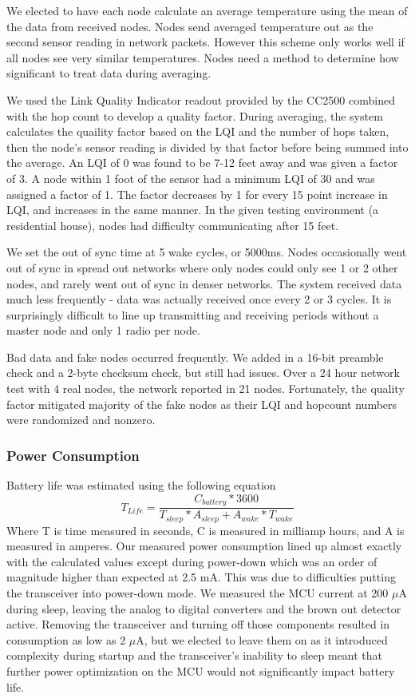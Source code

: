 We elected to have each node calculate an average temperature using the mean of the data from received nodes. Nodes send averaged temperature out as the second sensor reading in network packets. However this scheme only works well if all nodes see very similar temperatures. Nodes need a method to determine how significant to treat data during averaging.

We used the Link Quality Indicator readout provided by the CC2500 combined with the hop count to develop a quality factor. During averaging, the system calculates the quaility factor based on the LQI and the number of hops taken, then the node's sensor reading is divided by that factor before being summed into the average. An LQI of 0 was found to be 7-12 feet away and was given a factor of 3. A node within 1 foot of the sensor had a minimum LQI of 30 and was assigned a factor of 1. The factor decreases by 1 for every 15 point increase in LQI, and increases in the same manner. In the given testing environment (a residential house), nodes had difficulty communicating after 15 feet.

We set the out of sync time at 5 wake cycles, or 5000ms. Nodes occasionally went out of sync in spread out networks where only nodes could only see 1 or 2 other nodes, and rarely went out of sync in denser networks. The system received data much less frequently - data was actually received once every 2 or 3 cycles. It is surprisingly difficult to line up transmitting and receiving periods without a master node and only 1 radio per node.

Bad data and fake nodes occurred frequently. We added in a 16-bit preamble check and a 2-byte checksum check, but still had issues. Over a 24 hour network test with 4 real nodes, the network reported in 21 nodes. Fortunately, the quality factor mitigated majority of the fake nodes as their LQI and hopcount numbers were randomized and nonzero.

\subsubsection{Power Consumption}
Battery life was estimated using the following equation
\[T_{Life}=\frac{C_{battery} * 3600}{T_{sleep}*A_{sleep} + A_{wake}*T_{wake}}\] Where T is time measured in seconds, C is measured in milliamp hours, and A is measured in amperes.
Our measured power consumption lined up almost exactly with the calculated values except during power-down which was an order of magnitude higher than expected at 2.5 mA. This was due to difficulties putting the transceiver into power-down mode. We measured the MCU current at 200 $\mu$A during sleep, leaving the analog to digital converters and the brown out detector active. Removing the transceiver and turning off those components resulted in consumption as low as 2 $\mu$A, but we elected to leave them on as it introduced complexity during startup and the transceiver's inability to sleep meant that further power optimization on the MCU would not significantly impact battery life.

